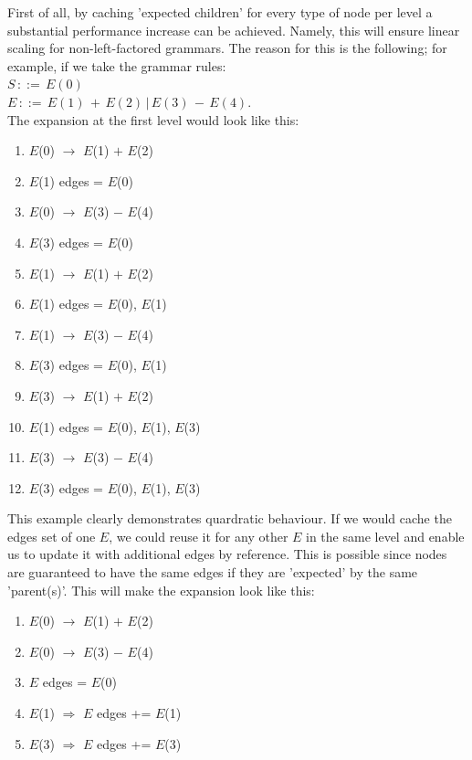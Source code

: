\documentclass[a4paper,10pt]{article}
\begin{document}
First of all, by caching 'expected children' for every type of node per level a substantial performance increase can be achieved. Namely, this will ensure linear scaling for non-left-factored grammars. The reason for this is the following; for example, if we take the grammar rules:\\
$S\,::=\,E(0)$\\
$E\,::=\,E(1)\,+\,E(2)\,|\,E(3)\,-\,E(4)$.\\
The expansion at the first level would look like this:
\begin{enumerate}
 \setlength{\itemsep}{0pt}
 \setlength{\parskip}{0pt}
 \setlength{\parsep}{0pt}
 
 \item $E$(0) $\rightarrow$ $E$(1) $+$ $E$(2)
 \item $E$(1) edges = {$E$(0)}
 \item $E$(0) $\rightarrow$ $E$(3) $-$ $E$(4)
 \item $E$(3) edges = {$E$(0)}
 \item $E$(1) $\rightarrow$ $E$(1) $+$ $E$(2)
 \item $E$(1) edges = {$E$(0), $E$(1)}
 \item $E$(1) $\rightarrow$ $E$(3) $-$ $E$(4)
 \item $E$(3) edges = {$E$(0), $E$(1)}
 \item $E$(3) $\rightarrow$ $E$(1) $+$ $E$(2)
 \item $E$(1) edges = {$E$(0), $E$(1), $E$(3)}
 \item $E$(3) $\rightarrow$ $E$(3) $-$ $E$(4)
 \item $E$(3) edges = {$E$(0), $E$(1), $E$(3)}
\end{enumerate}
This example clearly demonstrates quardratic behaviour. If we would cache the edges set of one $E$, we could reuse it for any other $E$ in the same level and enable us to update it with additional edges by reference. This is possible since nodes are guaranteed to have the same edges if they are 'expected' by the same 'parent(s)'. This will make the expansion look like this:
\begin{enumerate}
 \setlength{\itemsep}{0pt}
 \setlength{\parskip}{0pt}
 \setlength{\parsep}{0pt}
 
 \item $E$(0) $\rightarrow$ $E$(1) $+$ $E$(2)
 \item $E$(0) $\rightarrow$ $E$(3) $-$ $E$(4)
 \item $E$ edges = {$E$(0)}
 \item $E$(1) $\Rightarrow$ $E$ edges += $E$(1)
 \item $E$(3) $\Rightarrow$ $E$ edges += $E$(3)
\end{enumerate}
\end{document}
